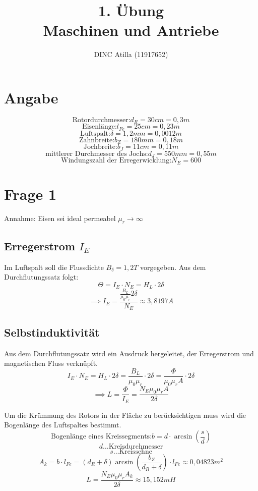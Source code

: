 \documentclass[a4paper]{article}
\title{1. Übung\\Maschinen und Antriebe}
\author{DINC Atilla (11917652)}
\begin{document}
\normalsize
\maketitle

\section*{Angabe}
    \begin{fleqn}[2em]
        \[ \text{Rotordurchmesser:}d_{R}=30cm=0,3m \]
        \[ \text{Eisenlänge:} l_{Fe}=25cm=0,23m\]
        \[ \text{Luftspalt:} \delta=1,2mm=0,0012m\]
        \[ \text{Zahnbreite:}b_{Z}=180mm=0,18m \]
        \[ \text{Jochbreite:}b_{J}=11cm=0,11m \]
        \[ \text{mittlerer Durchmesser des Jochs:}d_{J}=550mm=0,55m \]
        \[ \text{Windungszahl der Erregerwicklung:}N_{E}=600 \]
    \end{fleqn}

    \section*{Frage 1}
    Annahme: Eisen sei ideal permeabel $\mu_{r}\to \infty$ 
    \subsection*{Erregerstrom $I_{E}$}
    Im Luftspalt soll die Flussdichte $B_{\delta}=1,2T$ vorgegeben.
    Aus dem Durchflutungssatz folgt:\newline
    \[ \Theta=I_{E}\cdot N_{E}=H_{L}\cdot 2\delta \]
    \[ \implies I_{E}=\frac{\frac{B_{L}}{\mu_{0}\mu_{r}}2\delta}{N_{E}}\approx3,8197A\]
    \subsection*{Selbstinduktivität}
    Aus dem Durchflutungssatz wird ein Ausdruck hergeleitet, der Erregerstrom und magnetischen Fluss verknüpft.
    \[ I_{E}\cdot N_{E}=H_{L}\cdot 2\delta =\frac{B_{L}}{\mu_{0}\mu_{r}}\cdot 2\delta=\frac{\Phi}{\mu_{0}\mu_{r}A}\cdot 2\delta\]
    \begin{equation} \implies L=\frac{\Phi}{I_{E}}=\frac{N_{E}\mu_{0}\mu_{r}A}{2\delta} \end{equation}
    
    Um die Krümmung des Rotors in der Fläche zu berücksichtigen muss wird die Bogenlänge des Luftspaltes bestimmt.
    \[ \text{Bogenlänge eines Kreissegments:}b=d\cdot \arcsin(\frac{s}{d}) \]
    \[ d\text{\ldots Kreisdurchmesser} \]
    \[ s\text{\ldots Kreissehne} \]
    \[ A_{k}=b\cdot l_{Fe} = (d_{R}+\delta)\arcsin(\frac{b_{Z}}{d_{R}+\delta})\cdot l_{Fe}\approx 0,04823 m^2\]
    \[ L= \frac{N_{E}\mu_{0}\mu_{r}A_{k}}{2\delta}\approx 15,152 mH\]
    
\end{document}

